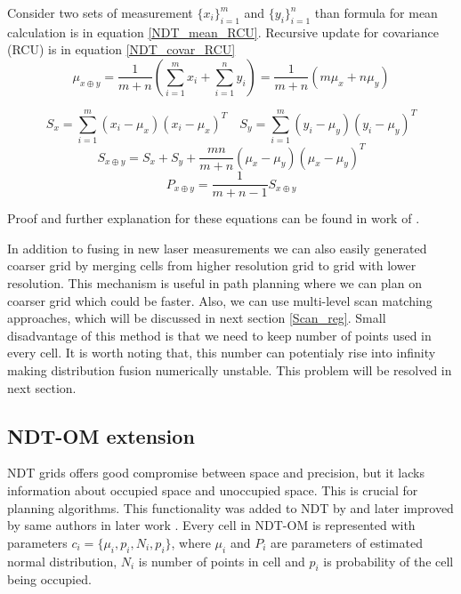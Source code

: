 Consider two sets of measurement $\{x_{i}\}^{m}_{i=1}$ and $\{y_{i}\}^{n}_{i=1}$ than formula for mean calculation is in equation \eqref{NDT_mean_RCU}. Recursive update for covariance (RCU) is in equation \eqref{NDT_covar_RCU}
\begin{equation}
\label{NDT_mean_RCU}
\mu_{x\oplus y} =\dfrac{1}{m + n}(\sum_{i =1}^{m}x_{i} + \sum_{i=1}^{n}y_{i}) = \frac{1}{m+n}(m\mu_{x} + n\mu_{y})
\end{equation} 

\begin{equation}
S_{x} = \sum_{i=1}^{m}(x_{i} - \mu_{x})(x_{i} - \mu_{x})^{T} \quad 
S_{y} = \sum_{i=1}^{m}(y_{i} - \mu_{y})(y_{i} - \mu_{y})^{T}
\end{equation}
\begin{equation}
S_{x\oplus y} = S_{x} + S_{y} + \dfrac{mn}{m+n}(\mu_{x} - \mu_{y})(\mu_{x} - \mu_{y})^{T}
\end{equation}
\begin{equation}
\label{NDT_covar_RCU}
P_{x\oplus y} = \dfrac{1}{m+n -1}S_{x\oplus y}
\end{equation}

Proof and further explanation for these equations can be found in work of \cite{Saarinen13}.

In addition to fusing in new laser measurements we can also easily generated coarser grid by merging cells from higher resolution grid to grid with lower resolution. This mechanism is useful in path planning where we can plan on coarser grid which could be faster. Also, we can use multi-level scan matching approaches, which will be discussed in next section \ref{Scan_reg}. Small disadvantage of this method is that we need to keep number of points used in every cell. It is worth noting that, this number can potentialy rise into infinity making distribution fusion numerically unstable. This problem will be resolved in next section.     
\newpage 
\subsection{NDT-OM extension}
NDT grids offers good compromise between space and precision, but it lacks information about occupied space and unoccupied space. This is crucial for planning algorithms. This functionality was added to NDT by \cite{Saarinen13} and later improved by same authors in later work \cite{Saarinen213}. Every cell in NDT-OM is represented with parameters $c_{i}=\{\mu_{i}, p_{i}, N_{i},p_{i}\}$, where $\mu_{i}$ and $P_{i}$ are parameters of estimated normal distribution, $N_{i}$ is number of points in cell and $p_{i}$ is probability of the cell being occupied. 

